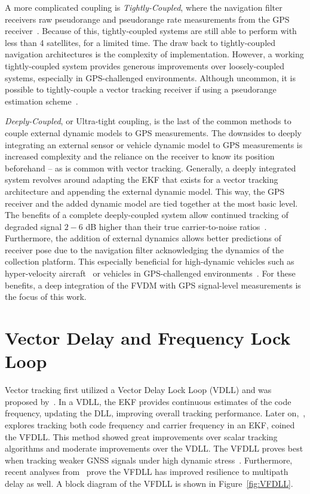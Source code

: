 A more complicated coupling is \textit{Tightly-Coupled}, where the navigation filter receivers raw pseudorange and pseudorange rate measurements from the GPS receiver~\cite{kaplanUnderstandingGPSPrinciples2006}. Because of this, tightly-coupled systems are still able to perform with less than 4 satellites, for a limited time. The draw back to tightly-coupled navigation architectures is the complexity of implementation. However, a working tightly-coupled system provides generous improvements over loosely-coupled systems, especially in GPS-challenged environments. Although uncommon, it is possible to tightly-couple a vector tracking receiver if using a pseudorange estimation scheme~\cite{grierElyaJoffeAndreas}.

\textit{Deeply-Coupled}, or Ultra-tight coupling, is the last of the common methods to couple external dynamic models to GPS measurements. The downsides to deeply integrating an external sensor or vehicle dynamic model to GPS measurements is increased complexity and the reliance on the receiver to know its position beforehand {--} as is common with vector tracking. Generally, a deeply integrated system revolves around adapting the EKF that exists for a vector tracking architecture and appending the external dynamic model. This way, the GPS receiver and the added dynamic model are tied together at the most basic level. The benefits of a complete deeply-coupled system allow continued tracking of degraded signal \(2-6\) dB higher than their true carrier-to-noise ratios~\cite{wattsGPSGLONASSL12019}. Furthermore, the addition of external dynamics allows better predictions of receiver pose due to the navigation filter acknowledging the dynamics of the collection platform. This especially beneficial for high-dynamic vehicles such as hyper-velocity aircraft~\cite{pozzobonSupersonicGNSSAuthentication} or vehicles in GPS-challenged environments~\cite{martinGPSCarrierPhase2017}. For these benefits, a deep integration of the FVDM with GPS signal-level measurements is the focus of this work.

\section{Vector Delay and Frequency Lock Loop}
Vector tracking first utilized a Vector Delay Lock Loop (VDLL) and was proposed by~\cite{e.m.coppsOptimalProcessingGPS1980}. In a VDLL\@, the EKF provides continuous estimates of the code frequency, updating the DLL, improving overall tracking performance. Later on,~\cite{bradfordparkinsonGlobalPositioningSystem1996}, explores tracking both code frequency and carrier frequency in an EKF, coined the VFDLL\@. This method showed great improvements over scalar tracking algorithms and moderate improvements over the VDLL\@. The VFDLL proves best when tracking weaker GNSS signals under high dynamic stress~\cite{lashleyPerformanceAnalysisVector2009}. Furthermore, recent analyses from~\cite{ziedanMultipathChannelEstimation2012} prove the VFDLL has improved resilience to multipath delay as well. A block diagram of the VFDLL is shown in Figure~\ref{fig:VFDLL}.

